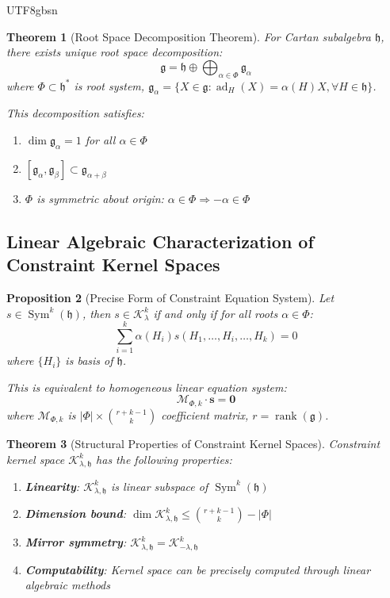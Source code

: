 \documentclass[a4paper,12pt]{extarticle}
\newtheorem{theorem}{Theorem}[section]
\newtheorem{proposition}[theorem]{Proposition}
\theoremstyle{definition}
\begin{document}
\begin{CJK}{UTF8}{gbsn}
\begin{theorem}[Root Space Decomposition Theorem]
\label{appendix:thm_root_decomposition}
For Cartan subalgebra $\mathfrak{h}$, there exists unique root space decomposition:
$$\mathfrak{g} = \mathfrak{h} \oplus \bigoplus_{\alpha \in \Phi} \mathfrak{g}_\alpha$$
where $\Phi \subset \mathfrak{h}^*$ is root system, $\mathfrak{g}_\alpha = \{X \in \mathfrak{g} : \operatorname{ad}_H(X) = \alpha(H)X, \forall H \in \mathfrak{h}\}$.

This decomposition satisfies:
\begin{enumerate}
    \item $\dim \mathfrak{g}_\alpha = 1$ for all $\alpha \in \Phi$
    \item $[\mathfrak{g}_\alpha, \mathfrak{g}_\beta] \subset \mathfrak{g}_{\alpha+\beta}$
    \item $\Phi$ is symmetric about origin: $\alpha \in \Phi \Rightarrow -\alpha \in \Phi$
\end{enumerate}
\end{theorem}

\subsection{Linear Algebraic Characterization of Constraint Kernel Spaces}
\label{appendix:subsec_constraint_kernel}

\begin{proposition}[Precise Form of Constraint Equation System]
\label{appendix:prop_constraint_system}
Let $s \in \operatorname{Sym}^k(\mathfrak{h})$, then $s \in \mathcal{K}^k_\lambda$ if and only if for all roots $\alpha \in \Phi$:
$$\sum_{i=1}^k \alpha(H_i) s(H_1, \ldots, H_i, \ldots, H_k) = 0$$
where $\{H_i\}$ is basis of $\mathfrak{h}$.

This is equivalent to homogeneous linear equation system:
$$\mathcal{M}_{\Phi,k} \cdot \mathbf{s} = \mathbf{0}$$
where $\mathcal{M}_{\Phi,k}$ is $|\Phi| \times \binom{r+k-1}{k}$ coefficient matrix, $r = \operatorname{rank}(\mathfrak{g})$.
\end{proposition}

\begin{theorem}[Structural Properties of Constraint Kernel Spaces]
\label{appendix:thm_kernel_structure}
Constraint kernel space $\mathcal{K}^k_{\lambda,\mathfrak{h}}$ has the following properties:
\begin{enumerate}
    \item \textbf{Linearity}: $\mathcal{K}^k_{\lambda,\mathfrak{h}}$ is linear subspace of $\operatorname{Sym}^k(\mathfrak{h})$
    \item \textbf{Dimension bound}: $\dim \mathcal{K}^k_{\lambda,\mathfrak{h}} \leq \binom{r+k-1}{k} - |\Phi|$
    \item \textbf{Mirror symmetry}: $\mathcal{K}^k_{\lambda,\mathfrak{h}} = \mathcal{K}^k_{-\lambda,\mathfrak{h}}$
    \item \textbf{Computability}: Kernel space can be precisely computed through linear algebraic methods
\end{enumerate}
\end{theorem}



\end{CJK}
\end{document}

